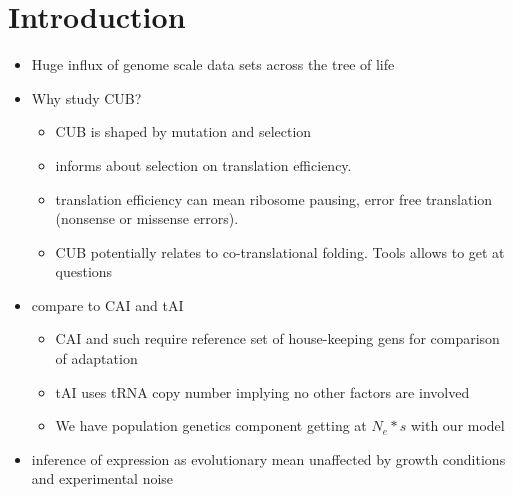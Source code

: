 \documentclass[12pt,draft]{article}
\begin{document}
\doublespacing
\linenumbers


\section*{Introduction}

\begin{itemize}
\item Huge influx of genome scale data sets across the tree of life
\item Why study CUB?
	\begin{itemize}
	\item CUB is shaped by mutation and selection
	\item informs about selection on translation efficiency.
	\item translation efficiency can mean ribosome pausing, error free translation (nonsense or missense errors).
	\item CUB potentially relates to co-translational folding. Tools allows to get at questions
	\end{itemize}
\item compare to CAI and tAI
	\begin{itemize}
	\item CAI and such require reference set of house-keeping gens for comparison of adaptation
	\item tAI uses tRNA copy number implying no other factors are involved
	\item We have population genetics component getting at $N_e * s$ with our model
	\end{itemize}
	
\item inference of expression as evolutionary mean unaffected by growth conditions and experimental noise



\end{itemize}



\section*{}
\end{document}
